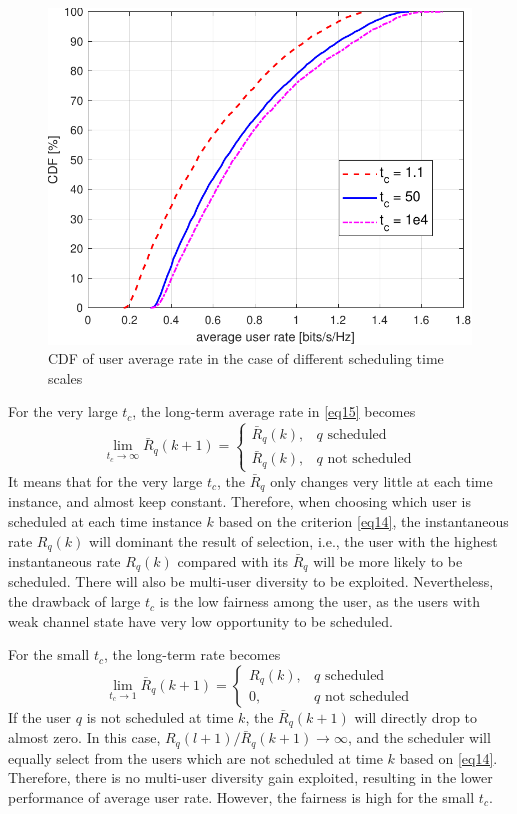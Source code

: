 \documentclass[10pt,conference]{IEEEtran}
\begin{document}
\begin{figure} [htb]
    \centering
    \includegraphics[width=1\linewidth]{Fig4.pdf}
    \caption{CDF of user average rate in the case of different scheduling time scales}
    \label{fig4}
\end{figure}

For the very large $t_c$, the long-term average rate in \eqref{eq15} becomes
\begin{equation}
    \lim_{t_c \rightarrow \infty}\bar{R}_q(k+1) = \begin{cases} \bar{R}_q(k),& q \text{ scheduled}\\\bar{R}_q(k),& q\text{ not scheduled} \end{cases} \label{eq20}
\end{equation}
It means that for the very large $t_c$, the $\bar{R}_q$ only changes very little
at each time instance, and almost keep constant. Therefore, when choosing which 
user is scheduled at each time instance $k$ based on the criterion \eqref{eq14},
the instantaneous rate $R_q(k)$ will dominant the result of selection, i.e.,
the user with the highest instantaneous rate $R_q(k)$ compared with its $\bar{R}_q$ will 
be more likely to be scheduled. There will also be multi-user diversity to 
be exploited. Nevertheless, the drawback of large $t_c$ is the low fairness 
among the user, as the users with weak channel state have very low 
opportunity to be scheduled. 

For the small $t_c$, the long-term rate becomes
\begin{equation}
    \lim_{t_c \rightarrow 1}\bar{R}_q(k+1) = \begin{cases} R_q(k),& q \text{ scheduled}\\0,& q\text{ not scheduled} \end{cases} \label{eq21}
\end{equation}
If the user $q$ is not scheduled at time $k$, the $\bar{R}_q(k+1)$ will directly drop to 
almost zero. In this case, $R_q(l+1) / \bar{R}_q(k+1) \rightarrow \infty$, and the 
scheduler will equally select from the users which are not scheduled at time $k$
based on \eqref{eq14}. Therefore, there is no multi-user diversity gain exploited, 
resulting in the lower performance of average user rate. However, the fairness is high
for the small $t_c$.
\end{document}
